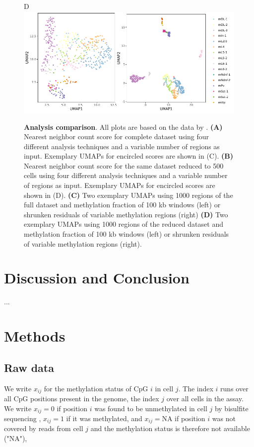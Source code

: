 \documentclass[twocolumn,10pt]{article}
\begin{document}
\begin{figure}[!htp]
	D\\
	\hspace{.39cm}\includegraphics[width=\columnwidth]{part_leonie_git/leonie_plots/UMAP_reduceddataset.pdf}
	\caption{\small \textbf{Analysis comparison}. All plots are based on the data by \citealp{luo2017single}. \textbf{(A)} Nearest neighbor count score for complete dataset using four different analysis techniques and a variable number of regions as input. Exemplary UMAPs for encircled scores are shown in (C). \textbf{(B)} Nearest neighbor count score for the same dataset reduced to 500 cells using four different analysis techniques and a variable number of regions as input. Exemplary UMAPs for encircled scores are shown in (D). \textbf{(C)} Two exemplary UMAPs using 1000 regions of the full dataset and methylation fraction of 100 kb windows (left) or shrunken residuals of variable methylation regions (right) \textbf{(D)} Two exemplary UMAPs using 1000 regions of the reduced dataset and methylation fraction of 100 kb windows (left) or shrunken residuals of variable methylation regions (right).}
	\label{figure:score}
\end{figure}

\section{Discussion and Conclusion}

...


\section{Methods}

\subsection{Raw data}

We write $x_{ij}$ for the methylation status of CpG $i$ in cell $j$. The index $i$ runs over all CpG positions present in the genome, the index $j$ over all cells in the assay. We write $x_{ij}=0$ if position $i$ was found to be unmethylated in cell $j$ by bisulfite sequencing , $x_{ij}=1$ if it was methylated, and $x_{ij}=\text{NA}$ if position $i$ was not covered by reads from cell $j$ and the methylation status is therefore not available ("NA"),
\end{document}
